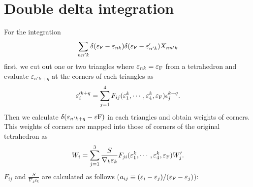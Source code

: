 \documentclass[letterpaper,10pt,pdftex,openany,english]{sphinxmanual}
\begin{document}
\section{Double delta integration}
\label{\detokenize{app:double-delta-integration}}
\sphinxAtStartPar
For the integration
\begin{equation*}
\begin{split}\begin{align}
\sum_{n n' k} \delta(\varepsilon_{\rm F} -
\varepsilon_{n k}) \delta(\varepsilon_{\rm F} - \varepsilon'_{n' k})
X_{n n' k}
\end{align}\end{split}
\end{equation*}
\sphinxAtStartPar
first, we cut out one or two triangles where
\(\varepsilon_{n k} = \varepsilon_{\rm F}\) from a tetrahedron
and evaluate \(\varepsilon_{n' k+q}\) at the corners of each triangles as
\begin{equation*}
\begin{split}\begin{align}
\varepsilon'^{k+q}_{i} = \sum_{j=1}^4 F_{i j}(
\varepsilon_1^{k}, \cdots, \varepsilon_{4}^{k}, \varepsilon_{\rm F})
\epsilon_{j}^{k+q}.
\end{align}\end{split}
\end{equation*}
\sphinxAtStartPar
Then we calculate \(\delta(\varepsilon_{n' k+q} - \varepsilon{\rm F})\)
in each triangles and obtain weights of corners.
This weights of corners are mapped into those of corners of the original tetrahedron as
\begin{equation*}
\begin{split}\begin{align}
W_{i} = \sum_{j=1}^3 \frac{S}{\nabla_k \varepsilon_k}F_{j i}(
\varepsilon_{1}^k, \cdots, \varepsilon_{4}^k, \varepsilon_{\rm F})
W'_{j}.
\end{align}\end{split}
\end{equation*}
\sphinxAtStartPar
\(F_{i j}\) and \(\frac{S}{\nabla_k \varepsilon_k}\) are calculated as follows
(\(a_{i j} \equiv (\varepsilon_i - \varepsilon_j)/(\varepsilon_{\rm F} - \varepsilon_j)\)):
\end{document}
